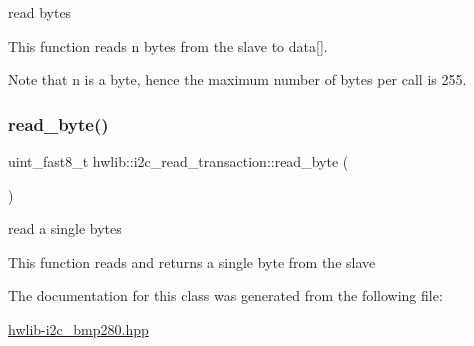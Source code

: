 read bytes

This function reads n bytes from the slave to data\mbox{[}\mbox{]}.

Note that n is a byte, hence the maximum number of bytes per call is 255. \mbox{\label{classhwlib_1_1i2c__read__transaction_a404a7d9db0ddd18aaeac84b266e89f9e}} 
\subsubsection{\texorpdfstring{read\_byte()}{read\_byte()}}
{\footnotesize\ttfamily uint\+\_\+fast8\+\_\+t hwlib\+::i2c\+\_\+read\+\_\+transaction\+::read\+\_\+byte (\begin{DoxyParamCaption}{ }\end{DoxyParamCaption})\hspace{0.3cm}{\ttfamily [inline]}}

read a single bytes

This function reads and returns a single byte from the slave 

The documentation for this class was generated from the following file\+:\begin{DoxyCompactItemize}
\item 
\mbox{\hyperlink{hwlib-i2c__bmp280_8hpp}{hwlib-\/i2c\+\_\+bmp280.\+hpp}}\end{DoxyCompactItemize}
